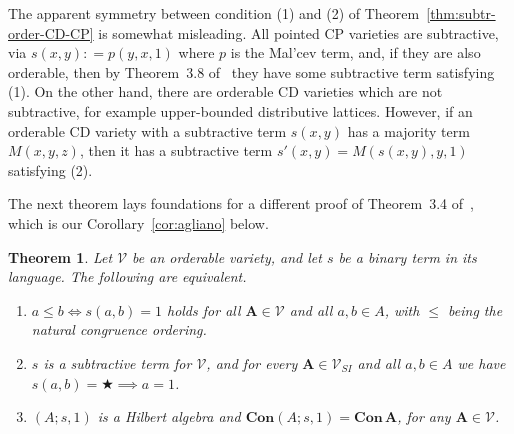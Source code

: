 \documentclass{amsart}
\newtheorem{theorem}{Theorem}[section]
\newcommand{\deq}{\mathrel{\mathop:}=}
\newcommand{\alg}[1]{\mathbf{#1}}
\newcommand{\Con}[1]{\mathbf{Con}\, #1}
\def\op{\bigstar}
\begin{document}
The apparent symmetry between condition (1) and (2) of
Theorem~\ref{thm:subtr-order-CD-CP} is somewhat misleading. All pointed CP varieties
are subtractive, via $s(x,y)\deq p(y,x,1)$ where $p$ is the Mal'cev term,
and, if they are also orderable, then by Theorem~3.8 of~\cite{ISW09} they have some
subtractive term satisfying (1).  On the other hand, there are
orderable CD varieties which are not subtractive, for example upper-bounded
distributive lattices. However, if an orderable CD variety with a subtractive
term $s(x,y)$ has a majority term $M(x,y,z)$, then it has a subtractive term
$s'(x,y) = M(s(x,y),y,1)$ satisfying (2). 

The next theorem lays foundations for a different proof of Theorem~3.4
of~\cite{Agl01}, which is our Corollary~\ref{cor:agliano} below.   

\begin{theorem}\label{thm:oprema}
Let $\mathcal{V}$ be an orderable variety, and let $s$ be a binary term in its
language. The following are equivalent.
\begin{enumerate}
\item $a\leq b \iff s(a,b) = 1$ holds for all $\alg{A}\in\mathcal{V}$ and all
  $a,b\in A$, with $\leq$ being the natural congruence ordering.
\item $s$ is a subtractive term for $\mathcal{V}$, and
for every $\alg{A}\in\mathcal{V}_{SI}$ and all $a,b\in A$ we have  
$s(a,b) = \op \implies a =1$. 
\item $(A; s, 1)$ is a Hilbert algebra and
$\mathbf{Con}(A; s,1) = \Con{\alg{A}}$, 
for any $\alg{A}\in\mathcal{V}$. 
\end{enumerate}  
\end{theorem}
\end{document}
